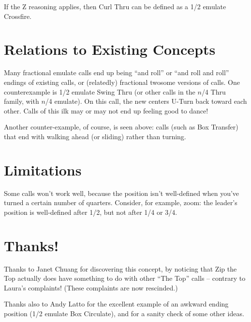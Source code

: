 \documentclass[11pt]{article}
\begin{document}


If the Z reasoning applies, then Curl Thru can be defined
as a 1/2 emulate Crossfire.

\section{Relations to Existing Concepts}

Many fractional emulate calls end up being ``and roll'' or ``and roll and
roll'' endings of existing calls,
or (relatedly) fractional twosome versions of calls.
One counterexample is 1/2 emulate Swing Thru
(or other calls in the $n$/4 Thru family, with $n$/4 emulate).
On this call, the new centers U-Turn back toward each other.
Calls of this ilk may or may not end up feeling good to dance!

Another counter-example, of course, is seen above:
calls (such as Box Transfer) that end with walking ahead
(or sliding) rather than turning.

\section{Limitations}

Some calls won't work well, because the position isn't well-defined
when you've turned a certain number of quarters.  Consider, for
example, zoom: the leader's position is well-defined after 1/2, but
not after 1/4 or 3/4.


\section{Thanks!}

Thanks to Janet Chuang for discovering this concept,
by noticing that Zip the Top actually does have something to do
with other ``The Top'' calls -- contrary to Laura's complaints!
(These complaints are now rescinded.)

Thanks also to Andy Latto for the excellent example
of an awkward ending position (1/2 emulate Box Circulate),
and for a sanity check of some other ideas.
\end{document}
